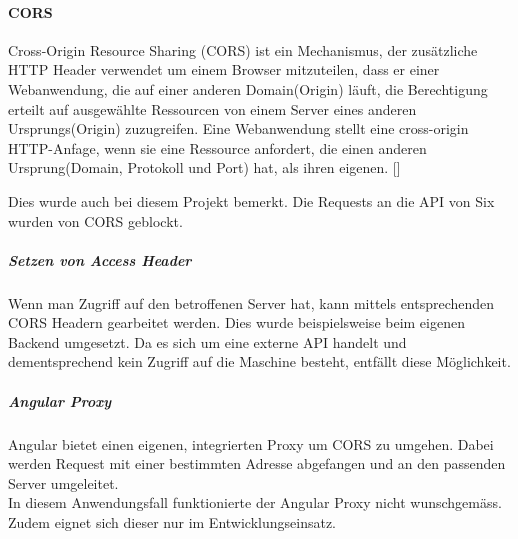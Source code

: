 \paragraph{CORS}\label{CORS}
\glqq Cross-Origin Resource Sharing (CORS) ist ein Mechanismus, der zusätzliche HTTP Header verwendet um einem Browser mitzuteilen, dass er einer Webanwendung, die auf einer anderen Domain(Origin) läuft, die Berechtigung erteilt auf ausgewählte Ressourcen von einem Server eines anderen Ursprungs(Origin) zuzugreifen. Eine Webanwendung stellt eine cross-origin HTTP-Anfage, wenn sie eine Ressource anfordert, die einen anderen Ursprung(Domain, Protokoll und Port) hat, als ihren eigenen.\grqq{} [\cite{cors}]

Dies wurde auch bei diesem Projekt bemerkt. Die Requests an die \ac{API} von Six wurden von \ac{CORS} geblockt. 

\subparagraph{Setzen von Access Header}
Wenn man Zugriff auf den betroffenen Server hat, kann mittels entsprechenden CORS Headern gearbeitet werden. Dies wurde beispielsweise beim eigenen Backend umgesetzt. Da es sich um eine externe API handelt und dementsprechend kein Zugriff auf die Maschine besteht, entfällt diese Möglichkeit. 

\subparagraph{Angular Proxy}
Angular bietet einen eigenen, integrierten Proxy um \ac{CORS} zu umgehen. Dabei werden Request mit einer bestimmten Adresse abgefangen und an den passenden Server umgeleitet.\\
In diesem Anwendungsfall funktionierte der Angular Proxy nicht wunschgemäss. Zudem eignet sich dieser nur im Entwicklungseinsatz. 

